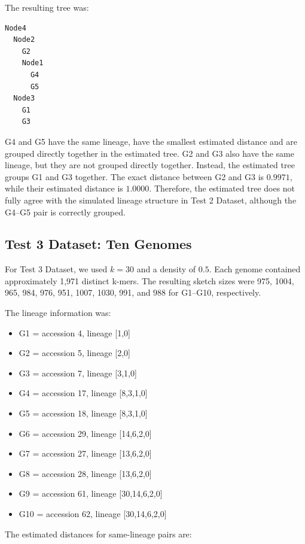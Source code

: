 \documentclass[11pt,a4paper]{article}
\begin{document}
The resulting tree was:

\begin{lstlisting}
Node4
  Node2
    G2
    Node1
      G4
      G5
  Node3
    G1
    G3
\end{lstlisting}

G4 and G5 have the same lineage, have the smallest estimated distance and are grouped directly together in the estimated tree. 
G2 and G3 also have the same lineage, but they are not grouped directly together. 
Instead, the estimated tree groups G1 and G3 together. 
The exact distance between G2 and G3 is $0.9971$, while their estimated distance is $1.0000$. 
Therefore, the estimated tree does not fully agree with the simulated lineage structure in Test 2 Dataset, although the G4--G5 pair is correctly grouped.



\subsection{Test 3 Dataset: Ten Genomes}
For Test 3 Dataset, we used $k=30$ and a density of $0.5$. Each genome contained
approximately 1,971 distinct k-mers. The resulting sketch sizes were
975, 1004, 965, 984, 976, 951, 1007, 1030, 991, and 988 for G1--G10,
respectively.


The lineage information was:

\begin{itemize}
    \item G1 = accession 4, lineage [1,0]
    \item G2 = accession 5, lineage [2,0]
    \item G3 = accession 7, lineage [3,1,0]
    \item G4 = accession 17, lineage [8,3,1,0]
    \item G5 = accession 18, lineage [8,3,1,0]
    \item G6 = accession 29, lineage [14,6,2,0]
    \item G7 = accession 27, lineage [13,6,2,0]
    \item G8 = accession 28, lineage [13,6,2,0]
    \item G9 = accession 61, lineage [30,14,6,2,0]
    \item G10 = accession 62, lineage [30,14,6,2,0]
\end{itemize}

The estimated distances for same-lineage pairs are:
\end{document}
